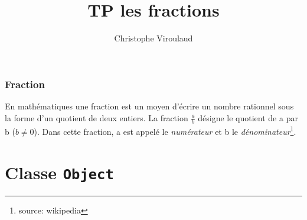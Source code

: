 \documentclass[svgnames,11pt]{beamer}
\author[]{Christophe Viroulaud}
\title{TP les fractions}
\date{}
\institute{Terminale - NSI}
\begin{document}
\begin{frame}
    \titlepage
\end{frame}
\begin{frame}
    \frametitle{Fraction}

    En mathématiques une fraction est un moyen d'écrire un nombre rationnel sous la forme d'un quotient de deux entiers. La fraction $\frac{a}{b}$ désigne le quotient de a par b ($b\neq0$). Dans cette fraction, a est appelé le \emph{numérateur} et b le \emph{dénominateur}\footnote{source: wikipedia}.
\end{frame}
\begin{frame}
    \frametitle{}


\end{frame}
\section{Classe \textbf{\texttt{Object}}}
\end{document}
